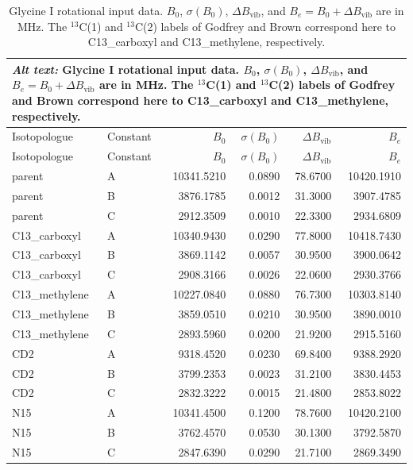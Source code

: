 \documentclass[12pt]{article}
\begin{document}
\begin{longtable}{llrrrr}
\caption{Glycine I rotational input data. $B_0$, $\sigma(B_0)$, $\Delta B_\mathrm{vib}$, and $B_e=B_0+\Delta B_\mathrm{vib}$ are in MHz. The $^{13}$C(1) and $^{13}$C(2) labels of Godfrey and Brown correspond here to C13\_carboxyl and C13\_methylene, respectively.}\label{tab:si-glycine-I-inputdata}\\
\multicolumn{6}{p{0.98\linewidth}}{\textit{Alt text:} Glycine I rotational input data. $B_0$, $\sigma(B_0)$, $\Delta B_\mathrm{vib}$, and $B_e=B_0+\Delta B_\mathrm{vib}$ are in MHz. The $^{13}$C(1) and $^{13}$C(2) labels of Godfrey and Brown correspond here to C13\_carboxyl and C13\_methylene, respectively.}\\
\toprule
Isotopologue & Constant & $B_0$ & $\sigma(B_0)$ & $\Delta B_\mathrm{vib}$ & $B_e$ \\
\midrule
\endfirsthead
\toprule
Isotopologue & Constant & $B_0$ & $\sigma(B_0)$ & $\Delta B_\mathrm{vib}$ & $B_e$ \\
\midrule
\endhead
parent & A & 10341.5210 & 0.0890 & 78.6700 & 10420.1910 \\
parent & B & 3876.1785 & 0.0012 & 31.3000 & 3907.4785 \\
parent & C & 2912.3509 & 0.0010 & 22.3300 & 2934.6809 \\
C13\_carboxyl & A & 10340.9430 & 0.0290 & 77.8000 & 10418.7430 \\
C13\_carboxyl & B & 3869.1142 & 0.0057 & 30.9500 & 3900.0642 \\
C13\_carboxyl & C & 2908.3166 & 0.0026 & 22.0600 & 2930.3766 \\
C13\_methylene & A & 10227.0840 & 0.0880 & 76.7300 & 10303.8140 \\
C13\_methylene & B & 3859.0510 & 0.0210 & 30.9500 & 3890.0010 \\
C13\_methylene & C & 2893.5960 & 0.0200 & 21.9200 & 2915.5160 \\
CD2 & A & 9318.4520 & 0.0230 & 69.8400 & 9388.2920 \\
CD2 & B & 3799.2353 & 0.0023 & 31.2100 & 3830.4453 \\
CD2 & C & 2832.3222 & 0.0015 & 21.4800 & 2853.8022 \\
N15 & A & 10341.4500 & 0.1200 & 78.7600 & 10420.2100 \\
N15 & B & 3762.4570 & 0.0530 & 30.1300 & 3792.5870 \\
N15 & C & 2847.6390 & 0.0290 & 21.7100 & 2869.3490 \\
\bottomrule
\end{longtable}
\end{document}
